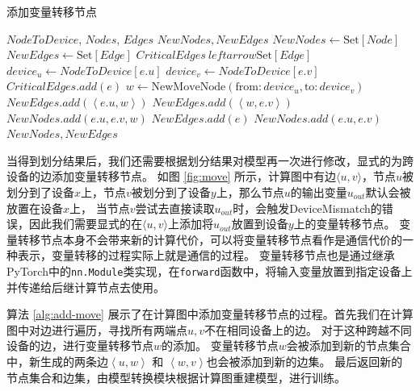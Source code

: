 \begin{algorithm}[h]
	\caption{添加变量转移节点}
	\label{alg:add-move}
	\begin{algorithmic}[1]
	\REQUIRE $\mathit{NodeToDevice}$, $\mathit{Nodes}$, $\mathit{Edges}$
	\ENSURE $\mathit{NewNodes}, \mathit{NewEdges}$
	\STATE  $\mathit{NewNodes} \leftarrow \mathrm{Set}[\mathit{Node}]$
	\STATE  $\mathit{NewEdges} \leftarrow \mathrm{Set}[\mathit{Edge}]$
	\STATE  $\mathit{CriticalEdges} \ leftarrow \mathrm{Set}[\mathit{Edge}]$
		\STATE $\mathit{device}_u \leftarrow \mathit{NodeToDevice}[e.u]$
		\STATE $\mathit{device}_v \leftarrow \mathit{NodeToDevice}[e.v]$
			\STATE $\mathit{CriticalEdges}.add(e)$
		\ENDIF
	\ENDFOR
			\STATE $w \leftarrow \mathrm{NewMoveNode}(\mathrm{from}:\mathit{device}_u, \mathrm{to}:\mathit{device}_v)$
			\STATE $\mathit{NewEdges}.add(\left\langle e.u,w\right\rangle)$
			\STATE $\mathit{NewEdges}.add(\left\langle w,e.v\right\rangle)$
			\STATE $\mathit{NewNodes}.add(e.u,e.v,w)$
		\ELSE
			\STATE $\mathit{NewEdges}.add(e)$
			\STATE $\mathit{NewNodes}.add(e.u, e.v)$
		\ENDIF
	\ENDFOR
	\RETURN $\mathit{NewNodes}, \mathit{NewEdges}$
	\end{algorithmic}
\end{algorithm}

当得到划分结果后，我们还需要根据划分结果对模型再一次进行修改，显式的为跨设备的边添加变量转移节点。
如图 \ref{fig:move} 所示，计算图中有边$\langle u,v\rangle$，节点$u$被划分到了设备$x$上，节点$v$被划分到了设备$y$上，那么节点$u$的输出变量$u_{out}$默认会被放置在设备$x$上，
当节点$v$尝试去直接读取$u_{out}$时，会触发DeviceMismatch的错误，因此我们需要显式的在$\langle u,v\rangle$上添加将$u_{out}$放置到设备$y$上的变量转移节点。
变量转移节点本身不会带来新的计算代价，可以将变量转移节点看作是通信代价的一种表示，变量转移的过程实际上就是通信的过程。
变量转移节点也是通过继承PyTorch中的\texttt{nn.Module}类实现，在\texttt{forward}函数中，将输入变量放置到指定设备上并传递给后继计算节点去使用。

算法 \ref{alg:add-move} 展示了在计算图中添加变量转移节点的过程。首先我们在计算图中对边进行遍历，寻找所有两端点$u,v$不在相同设备上的边。
对于这种跨越不同设备的边，进行变量转移节点$w$的添加。
变量转移节点$w$会被添加到新的节点集合中，新生成的两条边$\left\langle u,w\right\rangle$ 和 $\left\langle w,v\right\rangle $也会被添加到新的边集。
最后返回新的节点集合和边集，由模型转换模块根据计算图重建模型，进行训练。



